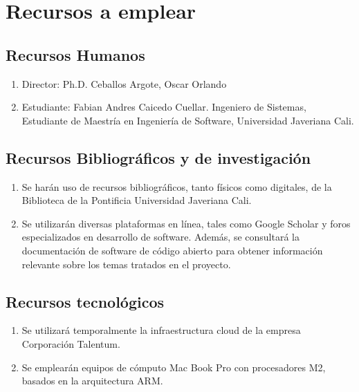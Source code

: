 \section{Recursos a emplear}

\subsection{Recursos Humanos}
\begin{enumerate}
    \item Director: Ph.D. Ceballos Argote, Oscar Orlando 
    \item Estudiante: Fabian Andres Caicedo Cuellar. Ingeniero de Sistemas, Estudiante de Maestría en Ingeniería de Software, Universidad Javeriana Cali.
\end{enumerate}

\subsection{Recursos Bibliográficos y de investigación}
\begin{enumerate}
    \item Se harán uso de recursos bibliográficos, tanto físicos como digitales, de la Biblioteca de la Pontificia Universidad Javeriana Cali.

    \item Se utilizarán diversas plataformas en línea, tales como Google Scholar y foros especializados en desarrollo de software. Además, se consultará la documentación de software de código abierto para obtener información relevante sobre los temas tratados en el proyecto.
\end{enumerate}

\subsection{Recursos tecnológicos}
\begin{enumerate}
    \item Se utilizará temporalmente la infraestructura cloud de la empresa Corporación Talentum.
    \item Se emplearán equipos de cómputo Mac Book Pro con procesadores M2, basados en la arquitectura ARM.
\end{enumerate}